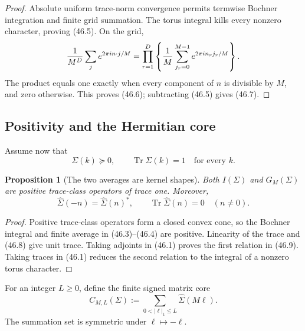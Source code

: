 \documentclass[11pt]{article}
\newtheorem{proposition}[theorem]{Proposition}
\theoremstyle{remark}
\begin{document}
\begin{proof}
Absolute uniform trace-norm convergence permits termwise Bochner
integration and finite grid summation.  The torus integral kills
every nonzero character, proving (46.5).  On the grid,
\[
 {1\over M^D}
 \sum_j e^{2\pi i n\cdot j/M}
 =
 \prod_{r=1}^D
 \left\{
 {1\over M}\sum_{j_r=0}^{M-1}
 e^{2\pi i n_rj_r/M}
 \right\}.
\]
The product equals one exactly when every component of \(n\) is
divisible by \(M\), and zero otherwise.  This proves (46.6);
subtracting (46.5) gives (46.7).
\end{proof}

\subsection{Positivity and the Hermitian core}

Assume now that
\begin{equation}
 \Sigma(k)\succeq0,\qquad
 \operatorname{Tr}\Sigma(k)=1
 \quad\text{for every }k.                        \tag{46.8}
\end{equation}

\begin{proposition}[The two averages are kernel shapes]
\label{prop:v12v46-positive-averages}
Both \(I(\Sigma)\) and \(G_M(\Sigma)\) are positive trace-class
operators of trace one.  Moreover,
\begin{equation}
 \widehat\Sigma(-n)=\widehat\Sigma(n)^*,\qquad
 \operatorname{Tr}\widehat\Sigma(n)=0
 \quad(n\ne0).                                   \tag{46.9}
\end{equation}
\end{proposition}

\begin{proof}
Positive trace-class operators form a closed convex cone, so the
Bochner integral and finite average in (46.3)--(46.4) are positive.
Linearity of the trace and (46.8) give unit trace.  Taking adjoints
in (46.1) proves the first relation in (46.9).  Taking traces in
(46.1) reduces the second relation to the integral of a nonzero
torus character.
\end{proof}

For an integer \(L\geq0\), define the finite signed matrix core
\begin{equation}
 C_{M,L}(\Sigma)
 :=
 \sum_{0<|\ell|_1\leq L}\widehat\Sigma(M\ell).    \tag{46.10}
\end{equation}
The summation set is symmetric under \(\ell\mapsto-\ell\).
\end{document}
